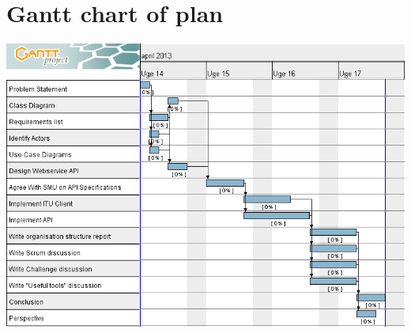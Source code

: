 \section{Gantt chart of plan}
\label{app:gantt}

\includegraphics[scale=0.5]{./Empiri/Planning/img/gantt-chart.png}